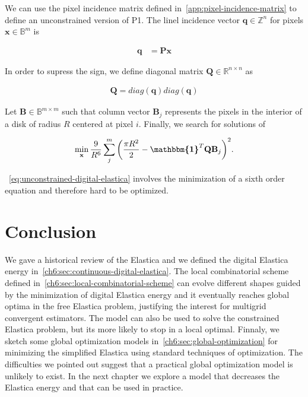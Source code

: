 We can use the pixel incidence matrix defined in~\cref{app:pixel-incidence-matrix} to define an unconstrained version of P1. The linel incidence vector $\mathbf{q} \in \mathbb{Z}^n$ for pixels $\mathbf{x} \in \mathbb{B}^{m}$ is 
	
	\begin{align*}
		\mathbf{q} &= \mathbf{P} \mathbf{x}
	\end{align*}

In order to supress the sign, we define diagonal matrix $\mathbf{Q} \in \mathbb{R}^{n \times n }$ as

\begin{align*}
	\mathbf{Q} = diag(\mathbf{q})diag(\mathbf{q})
\end{align*}

Let $\mathbf{B} \in \mathbb{B}^{m\times m}$ such that column vector $\mathbf{B}_j$ represents the pixels in the interior of a disk of radius $R$ centered at pixel $i$. Finally, we search for solutions of

\begin{align}
	\min_{\mathbf{x}} \frac{9}{R^6}\sum_{j}^{m}{\left( \frac{\pi R^2}{2} - \boldsymbol{\mathbbm{1}}^T{\mathbf{Q}}\mathbf{B}_j \right)^2}.
	\label{eq:unconstrained-digital-elastica}
\end{align}


~\cref{eq:unconstrained-digital-elastica} involves the minimization of a sixth order equation and therefore hard to be optimized.

\section{Conclusion}
\label{ch6:sec:conclusion}
We gave a historical review of the Elastica and we defined the digital Elastica energy in~\cref{ch6:sec:continuous-digital-elastica}. The local combinatorial scheme defined in~\cref{ch6:sec:local-combinatorial-scheme} can evolve different shapes guided by the minimization of digital Elastica energy and it eventually reaches global optima in the free Elastica problem, justifying the interest for multigrid convergent estimators. The model can also be used to solve the constrained Elastica problem, but its more likely to stop in a local optimal. Finnaly, we sketch some global optimization models in~\cref{ch6:sec:global-optimization} for minimizing the simplified Elastica using standard techniques of optimization. The difficulties we pointed out suggest that a practical global optimization model is unlikely to exist. In the next chapter we explore a model that decreases the Elastica energy and that can be used in practice.


